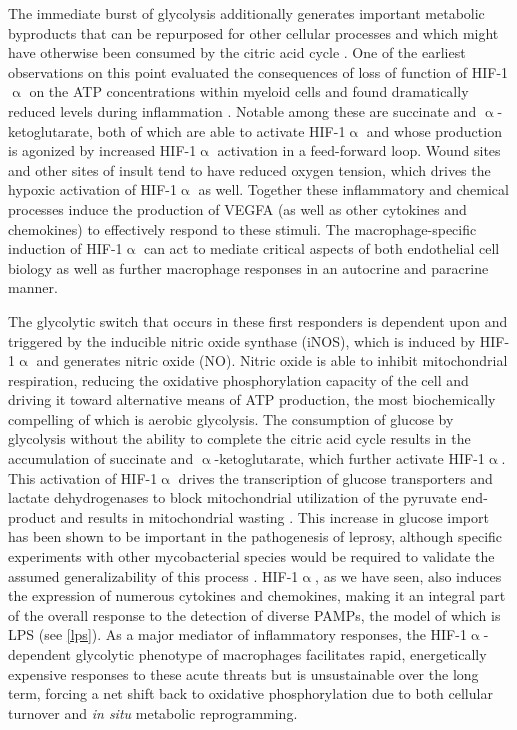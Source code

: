 The immediate burst of glycolysis additionally generates important metabolic byproducts that can be repurposed for other cellular processes and which might have otherwise been consumed by the citric acid cycle \citep{Kelly2015, Viola2019}. One of the earliest observations on this point evaluated the consequences of loss of function of HIF\hyp{}1$\upalpha$ on the ATP concentrations within myeloid cells and found dramatically reduced levels during inflammation \citep{Cramer2003}. Notable among these are succinate and $\upalpha$\hyp{}ketoglutarate, both of which are able to activate HIF\hyp{}1$\upalpha$ and whose production is agonized by increased HIF\hyp{}1$\upalpha$ activation in a feed\hyp{}forward loop. Wound sites and other sites of insult tend to have reduced oxygen tension, which drives the hypoxic activation of HIF\hyp{}1$\upalpha$ as well. Together these inflammatory and chemical processes induce the production of VEGFA (as well as other cytokines and chemokines) to effectively respond to these stimuli. The macrophage\hyp{}specific induction of HIF\hyp{}1$\upalpha$ can act to mediate critical aspects of both endothelial cell biology as well as further macrophage responses in an autocrine and paracrine manner.

The glycolytic switch that occurs in these first responders is dependent upon and triggered by the inducible nitric oxide synthase (iNOS), which is induced by HIF\hyp{}1$\upalpha$ and generates nitric oxide (NO). Nitric oxide is able to inhibit mitochondrial respiration, reducing the oxidative phosphorylation capacity of the cell and driving it toward alternative means of ATP production, the most biochemically compelling of which is aerobic glycolysis. The consumption of glucose by glycolysis without the ability to complete the citric acid cycle results in the accumulation of succinate and $\upalpha$\hyp{}ketoglutarate, which further activate HIF\hyp{}1$\upalpha$. This activation of HIF\hyp{}1$\upalpha$ drives the transcription of glucose transporters and lactate dehydrogenases to block mitochondrial utilization of the pyruvate end\hyp{}product and results in mitochondrial wasting \citep{GalvanPena2014, Russell2019a}. This increase in glucose import has been shown to be important in the pathogenesis of leprosy, although specific experiments with other mycobacterial species would be required to validate the assumed generalizability of this process \citep{Medeiros2016, MontoyaRosales2016, Vance2019}. HIF\hyp{}1$\upalpha$, as we have seen, also induces the expression of numerous cytokines and chemokines, making it an integral part of the overall response to the detection of diverse PAMPs, the model of which is LPS (see \autoref{lps}). As a major mediator of inflammatory responses, the HIF\hyp{}1$\upalpha$\hyp{}dependent glycolytic phenotype of macrophages facilitates rapid, energetically expensive responses to these acute threats but is unsustainable over the long term, forcing a net shift back to oxidative phosphorylation due to both cellular turnover and \textit{in situ} metabolic reprogramming.


